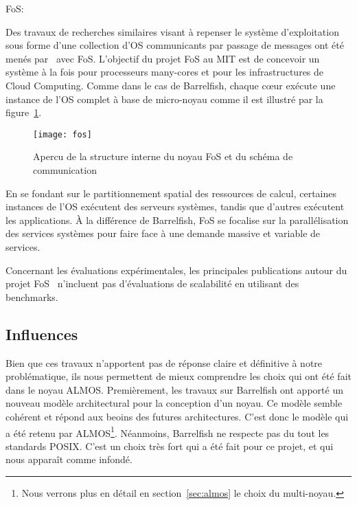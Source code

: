       \begin{paragraph}{FoS:}

        Des travaux de recherches similaires visant à repenser le système
        d’exploitation sous forme d’une collection d’OS communicants par passage
        de messages ont été menés par~\citet{wentzlaff2009factored} avec
        FoS. L’objectif du projet FoS au MIT est de concevoir un système à la
        fois pour processeurs many-cores et pour les infrastructures de Cloud
        Computing. Comme dans le cas de Barrelfish, chaque c\oe ur exécute une
        instance de l’OS complet à base de micro-noyau comme il est illustré par
        la figure~\ref{fig:fos}.

        \begin{figure}[h]
          \centering
          \texttt{[image: fos]}
          \caption{Apercu de la structure interne du noyau FoS et du schéma de
            communication}
          \label{fig:fos}
        \end{figure}

        En se fondant sur le partitionnement spatial des ressources de calcul,
        certaines instances de l’OS exécutent des serveurs systèmes, tandis que
        d’autres exécutent les applications. À la différence de Barrelfish, FoS
        se focalise sur la parallélisation des services systèmes pour faire face
        à une demande massive et variable de services.

        Concernant les évaluations expérimentales, les principales publications
        autour du projet FoS~\citep{wentzlaff2009factored,
          wentzlaff2010operating} n’incluent pas d'évaluations de scalabilité en
        utilisant des benchmarks.

      \end{paragraph}
      
    \subsection{Influences}

      Bien que ces travaux n'apportent pas de réponse claire et définitive à
      notre problématique, ils nous permettent de mieux comprendre les choix qui
      ont été fait dans le noyau ALMOS. Premièrement, les travaux sur Barrelfish
      ont apporté un nouveau modèle architectural pour la conception d'un
      noyau. Ce modèle semble cohérent et répond aux beoins des futures
      architectures. C'est donc le modèle qui a été retenu par
      ALMOS\footnote{Nous verrons plus en détail en section~\ref{sec:almos} le
        choix du multi-noyau.}. Néanmoins, Barrelfish ne respecte pas du tout
      les standards POSIX. C'est un choix très fort qui a été fait pour ce
      projet, et qui nous apparaît comme infondé.

